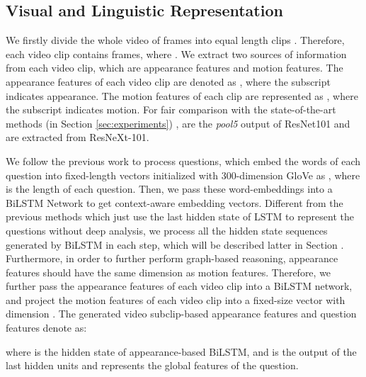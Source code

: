 \documentclass[journal]{IEEEtran}
\begin{document}
\subsection{Visual and Linguistic Representation} 
We firstly divide the whole video  of  frames into  equal length clips . Therefore, each video clip  contains  frames, where . We extract two sources of information from each video clip, which are appearance features and motion features. The appearance features of each video clip  are denoted as , where the subscript  indicates appearance. The motion features of each clip are represented as , where the subscript  indicates motion. For fair comparison with the state-of-the-art methods (in Section \ref{sec:experiments}) \cite{le2020hierarchical},  are the \textit{pool5} output of ResNet101 and  are extracted from ResNeXt-101.

We follow the previous work \cite{le2020hierarchical,yang2019question} to process questions, which embed the words of each question into fixed-length vectors initialized with 300-dimension GloVe \cite{pennington2014glove} as , where  is the length of each question. Then, we pass these word-embeddings into a BiLSTM Network to get context-aware embedding vectors. Different from the previous methods which just use the last hidden state of LSTM to represent the questions without deep analysis, we process all the hidden state sequences generated by BiLSTM  in each step, which will be described latter in Section . Furthermore, in order to further perform graph-based reasoning, appearance features should have the same dimension as motion features. Therefore, we further pass the appearance features of each video clip  into a BiLSTM network, and project the motion features  of each video clip  into a fixed-size vector with dimension . The generated video subclip-based appearance features  and question features  denote as:

where  is the hidden state of appearance-based BiLSTM, and  is the output of the last hidden units and represents the global features of the question.
\end{document}
